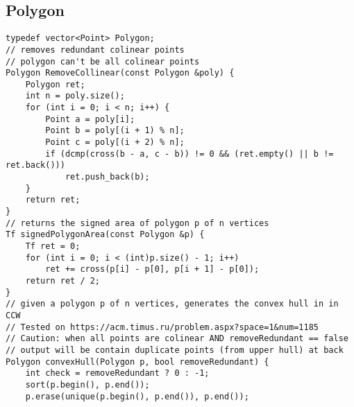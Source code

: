 \documentclass[FSZ,a4paper,onesided]{article}
\begin{document}
\begin{multicols*}{\COLS}
\subsection{Polygon}
\begin{lstlisting}
typedef vector<Point> Polygon;
// removes redundant colinear points
// polygon can't be all colinear points
Polygon RemoveCollinear(const Polygon &poly) {
    Polygon ret;
    int n = poly.size();
    for (int i = 0; i < n; i++) {
        Point a = poly[i];
        Point b = poly[(i + 1) % n];
        Point c = poly[(i + 2) % n];
        if (dcmp(cross(b - a, c - b)) != 0 && (ret.empty() || b != ret.back()))
            ret.push_back(b);
    }
    return ret;
}
// returns the signed area of polygon p of n vertices
Tf signedPolygonArea(const Polygon &p) {
    Tf ret = 0;
    for (int i = 0; i < (int)p.size() - 1; i++)
        ret += cross(p[i] - p[0], p[i + 1] - p[0]);
    return ret / 2;
}
// given a polygon p of n vertices, generates the convex hull in in CCW
// Tested on https://acm.timus.ru/problem.aspx?space=1&num=1185
// Caution: when all points are colinear AND removeRedundant == false
// output will be contain duplicate points (from upper hull) at back
Polygon convexHull(Polygon p, bool removeRedundant) {
    int check = removeRedundant ? 0 : -1;
    sort(p.begin(), p.end());
    p.erase(unique(p.begin(), p.end()), p.end());


\end{lstlisting}
\end{multicols*}
\end{document}
